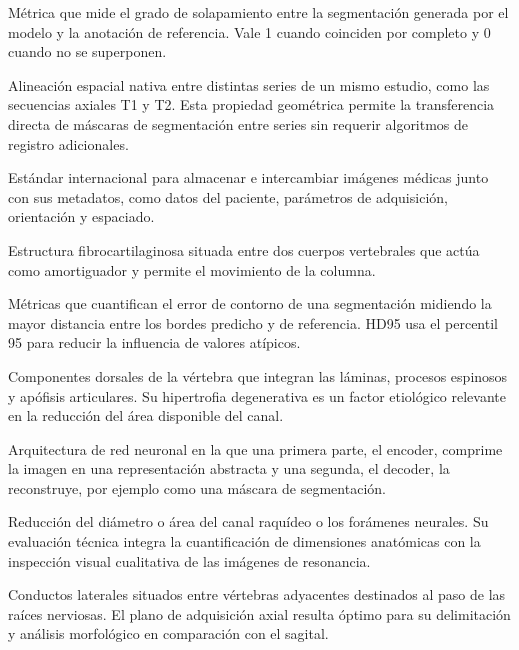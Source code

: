 \begin{description}[leftmargin=3.8cm, style=nextline, itemsep=3pt, topsep=3pt]
    \item[Coeficiente Dice] Métrica que mide el grado de solapamiento entre la segmentación generada por el modelo y la anotación de referencia. Vale 1 cuando coinciden por completo y 0 cuando no se superponen.

    \item[Co-registro DICOM] Alineación espacial nativa entre distintas series de un mismo estudio, como las secuencias axiales T1 y T2. Esta propiedad geométrica permite la transferencia directa de máscaras de segmentación entre series sin requerir algoritmos de registro adicionales.

    \item[DICOM] Estándar internacional para almacenar e intercambiar imágenes médicas junto con sus metadatos, como datos del paciente, parámetros de adquisición, orientación y espaciado.

    \item[Disco intervertebral] Estructura fibrocartilaginosa situada entre dos cuerpos vertebrales que actúa como amortiguador y permite el movimiento de la columna.

    \item[Distancia de Hausdorff y HD95] Métricas que cuantifican el error de contorno de una segmentación midiendo la mayor distancia entre los bordes predicho y de referencia. HD95 usa el percentil 95 para reducir la influencia de valores atípicos.

    \item[Elemento posterior (PE)] Componentes dorsales de la vértebra que integran las láminas, procesos espinosos y apófisis articulares. Su hipertrofia degenerativa es un factor etiológico relevante en la reducción del área disponible del canal.

    \item[Encoder-decoder] Arquitectura de red neuronal en la que una primera parte, el encoder, comprime la imagen en una representación abstracta y una segunda, el decoder, la reconstruye, por ejemplo como una máscara de segmentación.

    \item[Estenosis] Reducción del diámetro o área del canal raquídeo o los forámenes neurales. Su evaluación técnica integra la cuantificación de dimensiones anatómicas con la inspección visual cualitativa de las imágenes de resonancia.

    \item[Forámenes neurales (neuroforámenes)] Conductos laterales situados entre vértebras adyacentes destinados al paso de las raíces nerviosas. El plano de adquisición axial resulta óptimo para su delimitación y análisis morfológico en comparación con el sagital.


\end{description}
